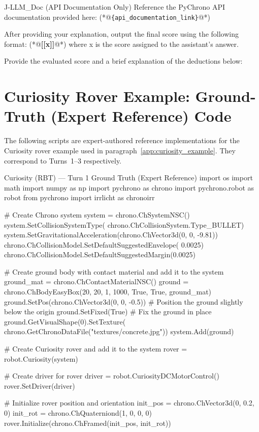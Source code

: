 \documentclass{ieeeaccess}
\begin{document}
\begin{appendices}
\begin{PromptBlock}{J-LLM\_Doc (API Documentation Only)}
Reference the PyChrono API documentation provided here: (*@\texttt{\{api\_documentation\_link\}}@*)

After providing your explanation, output the final score using the following format: (*@\textbf{[[x]]}@*) where x is the score assigned to the assistant's answer.

Provide the evaluated score and a brief explanation of the deductions below:
\end{PromptBlock}


\section{Curiosity Rover Example: Ground-Truth (Expert Reference) Code}
\label{app:curiosity_gt}

\noindent The following scripts are expert-authored reference implementations for the Curiosity rover example used in paragraph~\ref{app:curiosity_example}. They correspond to Turns~1--3 respectively.

\begin{CodeBlock}{Curiosity (RBT) --- Turn 1 Ground Truth (Expert Reference)}
import os
import math
import numpy as np
import pychrono as chrono
import pychrono.robot as robot
from pychrono import irrlicht as chronoirr

# Create Chrono system
system = chrono.ChSystemNSC()
system.SetCollisionSystemType(
    chrono.ChCollisionSystem.Type_BULLET)
system.SetGravitationalAcceleration(chrono.ChVector3d(0, 0, -9.81))
chrono.ChCollisionModel.SetDefaultSuggestedEnvelope(
    0.0025)
chrono.ChCollisionModel.SetDefaultSuggestedMargin(0.0025)

# Create ground body with contact material and add it to the system
ground_mat = chrono.ChContactMaterialNSC()
ground = chrono.ChBodyEasyBox(20, 20, 1, 1000, True, True, ground_mat)
ground.SetPos(chrono.ChVector3d(0, 0, -0.5))  # Position the ground slightly below the origin
ground.SetFixed(True)  # Fix the ground in place
ground.GetVisualShape(0).SetTexture(
    chrono.GetChronoDataFile("textures/concrete.jpg"))
system.Add(ground)

# Create Curiosity rover and add it to the system
rover = robot.Curiosity(system)

# Create driver for rover
driver = robot.CuriosityDCMotorControl()
rover.SetDriver(driver)

# Initialize rover position and orientation
init_pos = chrono.ChVector3d(0, 0.2, 0)
init_rot = chrono.ChQuaterniond(1, 0, 0, 0)
rover.Initialize(chrono.ChFramed(init_pos, init_rot))


\end{CodeBlock}
\end{appendices}
\end{document}
